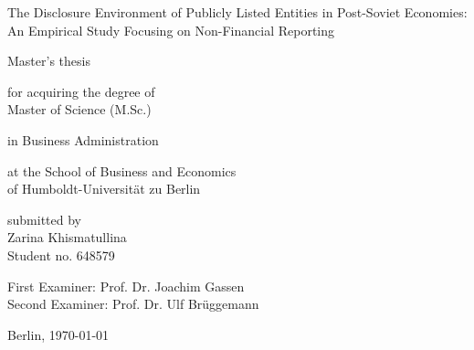 \begin{titlepage}
    \color{black}  %
    \thispagestyle{empty}
  
    \vspace*{2cm}
  
    {\Large
    \noindent The Disclosure Environment of Publicly Listed Entities in Post-Soviet Economies: An Empirical Study Focusing on Non-Financial Reporting}
    
    
  
    \vspace{2cm}
  
    {\LARGE
    \noindent
    Master’s thesis}
  
    \vspace{2cm}
  
    {\normalsize
    \noindent for acquiring the degree of\\
    Master of Science (M.Sc.)

    \vspace{0.5cm}

    \noindent in Business Administration
  
    \vspace{0.5cm}
  
    \noindent at the School of Business and Economics\\
    of Humboldt-Universität zu Berlin
  
    \vspace{2cm}
  
    \noindent submitted by\\
    Zarina Khismatullina\\
    Student no. 648579
  
    \vspace{2cm}
  
    \noindent First Examiner: Prof. Dr. Joachim Gassen\\
    Second Examiner: Prof. Dr. Ulf Brüggemann
  
    \vspace{1cm}
  
    \noindent Berlin, \today
    }
  
\end{titlepage}